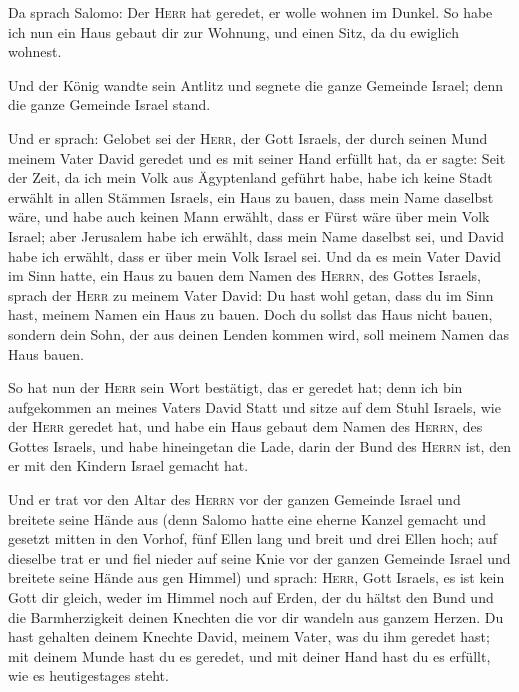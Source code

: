  Da sprach Salomo: Der \textsc{Herr} hat geredet, er wolle
wohnen im Dunkel.  So habe ich nun ein Haus gebaut dir zur
Wohnung, und einen Sitz, da du ewiglich wohnest.

 Und der König wandte sein Antlitz und segnete die ganze
Gemeinde Israel; denn die ganze Gemeinde Israel stand.

 Und er sprach: Gelobet sei der \textsc{Herr}, der Gott
Israels, der durch seinen Mund meinem Vater David geredet und es mit
seiner Hand erfüllt hat, da er sagte:  Seit der Zeit, da
ich mein Volk aus Ägyptenland geführt habe, habe ich keine Stadt erwählt
in allen Stämmen Israels, ein Haus zu bauen, dass mein Name daselbst
wäre, und habe auch keinen Mann erwählt, dass er Fürst wäre über mein
Volk Israel;  aber Jerusalem habe ich erwählt, dass mein
Name daselbst sei, und David habe ich erwählt, dass er über mein Volk
Israel sei.  Und da es mein Vater David im Sinn hatte, ein
Haus zu bauen dem Namen des \textsc{Herrn}, des Gottes Israels,
 sprach der \textsc{Herr} zu meinem Vater David: Du hast
wohl getan, dass du im Sinn hast, meinem Namen ein Haus zu bauen.
 Doch du sollst das Haus nicht bauen, sondern dein Sohn,
der aus deinen Lenden kommen wird, soll meinem Namen das Haus bauen.

 So hat nun der \textsc{Herr} sein Wort bestätigt, das er
geredet hat; denn ich bin aufgekommen an meines Vaters David Statt und
sitze auf dem Stuhl Israels, wie der \textsc{Herr} geredet hat, und habe
ein Haus gebaut dem Namen des \textsc{Herrn}, des Gottes Israels,
 und habe hineingetan die Lade, darin der Bund des
\textsc{Herrn} ist, den er mit den Kindern Israel gemacht hat.

 Und er trat vor den Altar des \textsc{Herrn} vor der
ganzen Gemeinde Israel und breitete seine Hände aus 
(denn Salomo hatte eine eherne Kanzel gemacht und gesetzt mitten in den
Vorhof, fünf Ellen lang und breit und drei Ellen hoch; auf dieselbe trat
er und fiel nieder auf seine Knie vor der ganzen Gemeinde Israel und
breitete seine Hände aus gen Himmel)  und sprach:
\textsc{Herr}, Gott Israels, es ist kein Gott dir gleich, weder im
Himmel noch auf Erden, der du hältst den Bund und die Barmherzigkeit
deinen Knechten die vor dir wandeln aus ganzem Herzen. 
Du hast gehalten deinem Knechte David, meinem Vater, was du ihm geredet
hast; mit deinem Munde hast du es geredet, und mit deiner Hand hast du
es erfüllt, wie es heutigestages steht.

